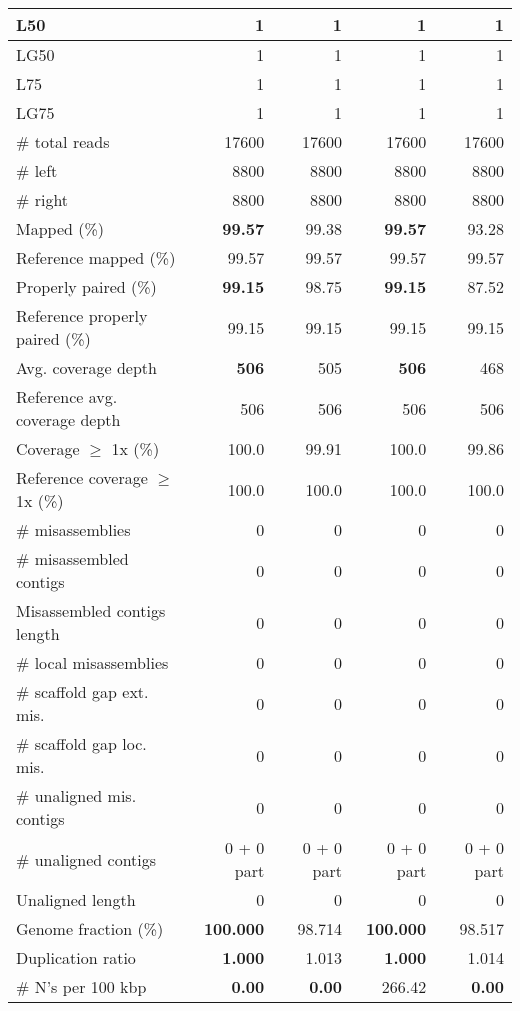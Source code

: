 \documentclass[12pt,a4paper]{article}
\begin{document}
\begin{table}[ht]
\begin{center}
\begin{tabular}{|l*{4}{|r}|}
L50 & 1 & 1 & 1 & 1 \\ \hline
LG50 & 1 & 1 & 1 & 1 \\ \hline
L75 & 1 & 1 & 1 & 1 \\ \hline
LG75 & 1 & 1 & 1 & 1 \\ \hline
\# total reads & 17600 & 17600 & 17600 & 17600 \\ \hline
\# left & 8800 & 8800 & 8800 & 8800 \\ \hline
\# right & 8800 & 8800 & 8800 & 8800 \\ \hline
Mapped (\%) & {\bf 99.57} & 99.38 & {\bf 99.57} & 93.28 \\ \hline
Reference mapped (\%) & 99.57 & 99.57 & 99.57 & 99.57 \\ \hline
Properly paired (\%) & {\bf 99.15} & 98.75 & {\bf 99.15} & 87.52 \\ \hline
Reference properly paired (\%) & 99.15 & 99.15 & 99.15 & 99.15 \\ \hline
Avg. coverage depth & {\bf 506} & 505 & {\bf 506} & 468 \\ \hline
Reference avg. coverage depth & 506 & 506 & 506 & 506 \\ \hline
Coverage $\geq$ 1x (\%) & 100.0 & 99.91 & 100.0 & 99.86 \\ \hline
Reference coverage $\geq$ 1x (\%) & 100.0 & 100.0 & 100.0 & 100.0 \\ \hline
\# misassemblies & 0 & 0 & 0 & 0 \\ \hline
\# misassembled contigs & 0 & 0 & 0 & 0 \\ \hline
Misassembled contigs length & 0 & 0 & 0 & 0 \\ \hline
\# local misassemblies & 0 & 0 & 0 & 0 \\ \hline
\# scaffold gap ext. mis. & 0 & 0 & 0 & 0 \\ \hline
\# scaffold gap loc. mis. & 0 & 0 & 0 & 0 \\ \hline
\# unaligned mis. contigs & 0 & 0 & 0 & 0 \\ \hline
\# unaligned contigs & 0 + 0 part & 0 + 0 part & 0 + 0 part & 0 + 0 part \\ \hline
Unaligned length & 0 & 0 & 0 & 0 \\ \hline
Genome fraction (\%) & {\bf 100.000} & 98.714 & {\bf 100.000} & 98.517 \\ \hline
Duplication ratio & {\bf 1.000} & 1.013 & {\bf 1.000} & 1.014 \\ \hline
\# N's per 100 kbp & {\bf 0.00} & {\bf 0.00} & 266.42 & {\bf 0.00} \\ \hline

\end{tabular}
\end{center}
\end{table}
\end{document}
